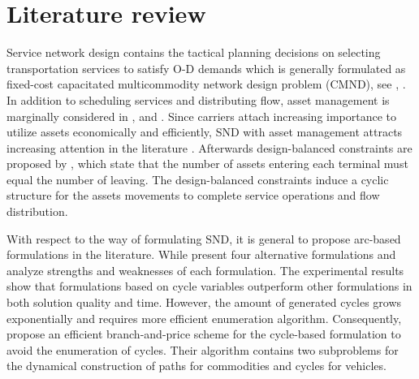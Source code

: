 \documentclass[11pt,nonblindrev,fleqn]{article}
\begin{document}
\section{Literature review}\label{review}
Service network design contains the tactical planning decisions on selecting transportation services to satisfy O-D demands which is generally formulated as fixed-cost capacitated multicommodity network design problem (CMND), see \cite{Magnanti1984Network}, \cite{Minoux1989Networks}. In addition to scheduling services and distributing flow, asset management is marginally considered in \cite{Crainic2000Service}, \cite{Smilowitz2002Deferred} and \cite{crainic2003long}. Since carriers attach increasing importance to utilize assets economically and efficiently, SND with asset management attracts increasing attention in the literature \citep{Andersen2009bService,Teypaz2010A}.   Afterwards design-balanced constraints are proposed by \cite{Pedersen2009Models}, which state that the number of assets entering each terminal must equal the number of leaving. The design-balanced constraints induce a cyclic structure for the assets movements to complete service operations and flow distribution.

With respect to the way of formulating SND, it is general to propose arc-based formulations in the literature. While \cite{Andersen2009bService} present four alternative formulations and analyze strengths and weaknesses of each formulation. The experimental results show that formulations based on cycle variables outperform other formulations in both solution quality and time. However, the amount of generated cycles grows exponentially and requires more efficient enumeration algorithm. Consequently, \cite{Andersen2011Branch} propose an efficient branch-and-price scheme for the cycle-based formulation to avoid the enumeration of cycles. Their algorithm contains two subproblems for the dynamical construction of paths for commodities and cycles for vehicles.
\end{document}
